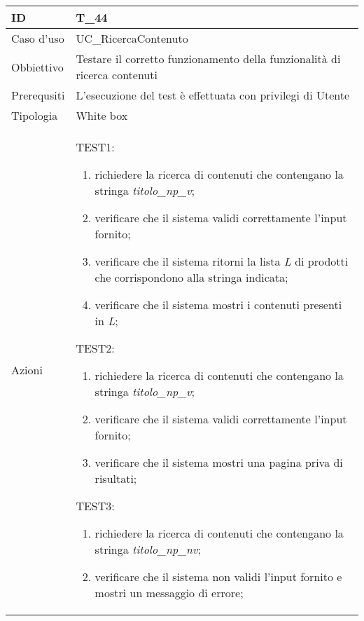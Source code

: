 \begin{table}[hb]
    \centering
    \begin{tabular}{ |p{2cm}|p{10cm}|  }
        \hline
        ID          & T\_44                                                                              \\\hline
        Caso d'uso  & UC\_RicercaContenuto                                                           \\\hline
        Obbiettivo  & Testare il corretto funzionamento della funzionalità di ricerca contenuti \\\hline
        Prerequsiti & L'esecuzione del test è effettuata con privilegi di Utente                         \\\hline
        Tipologia   & White box                                                                          \\\hline
        Azioni      &
        TEST1:
        \begin{enumerate}[nosep, topsep=0pt]
            \item richiedere la ricerca di contenuti che contengano la stringa \emph{titolo\_np\_v};
            \item verificare che il sistema validi correttamente l'input fornito;
            \item verificare che il sistema ritorni la lista \emph{L} di prodotti che corrispondono alla stringa indicata;
            \item verificare che il sistema mostri i contenuti presenti in \emph{L};
        \end{enumerate}
        \vspace{0.5cm} TEST2:
        \begin{enumerate}[nosep, topsep=0pt]
            \item richiedere la ricerca di contenuti che contengano la stringa \emph{titolo\_np\_v};
            \item verificare che il sistema validi correttamente l'input fornito;
            \item verificare che il sistema mostri una pagina priva di risultati;
        \end{enumerate}
        \vspace{0.5cm} TEST3:
        \begin{enumerate}[nosep, topsep=0pt]
            \item richiedere la ricerca di contenuti che contengano la stringa \emph{titolo\_np\_nv};
            \item verificare che il sistema non validi l'input fornito e mostri un messaggio di errore;
        \end{enumerate}
        \\\hline
    \end{tabular}
\end{table}

